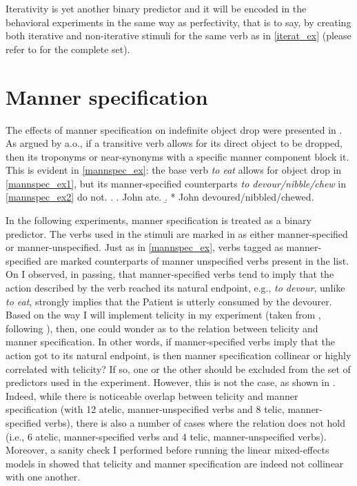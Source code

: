 Iterativity is yet another binary predictor and it will be encoded in the behavioral experiments in the same way as perfectivity, that is to say, by creating both iterative and non-iterative stimuli for the same verb as in \ref{iterat_ex} (please refer to  for the complete set).


\section{Manner specification} 

The effects of manner specification on indefinite object drop were presented in . As argued by \textcite{Ruda2017} a.o., if a transitive verb allows for its direct object to be dropped, then its troponyms or near-synonyms with a specific manner component block it. This is evident in \ref{mannspec_ex}: the base verb \textit{to eat} allows for object drop in \ref{mannspec_ex1}, but its manner-specified counterparts \textit{to devour/nibble/chew} in \ref{mannspec_ex2} do not.
\ex.\label{mannspec_ex} \a. John ate. \label{mannspec_ex1} 
\b. * John devoured/nibbled/chewed. \label{mannspec_ex2}

In the following experiments, manner specification is treated as a binary predictor. The verbs used in the stimuli are marked in  as either manner-specified or manner-unspecified. Just as in \ref{mannspec_ex}, verbs tagged as manner-specified are marked counterparts of manner unspecified verbs present in the list.\\
On  I observed, in passing, that manner-specified verbs tend to imply that the action described by the verb reached its natural endpoint, e.g., \textit{to devour}, unlike \textit{to eat}, strongly implies that the Patient is utterly consumed by the devourer. Based on the way I will implement telicity in my experiment (taken from \textcite{Olsen1997}, following \textcite{Medina2007}), then, one could wonder as to the relation between telicity and manner specification. In other words, if manner-specified verbs imply that the action got to its natural endpoint, is then manner specification collinear or highly correlated with telicity? If so, one or the other should be excluded from the set of predictors used in the experiment. However, this is not the case, as shown in . Indeed, while there is noticeable overlap between telicity and manner specification (with 12 atelic, manner-unspecified verbs and 8 telic, manner-specified verbs), there is also a number of cases where the relation does not hold (i.e., 6 atelic, manner-specified verbs and 4 telic, manner-unspecified verbs). Moreover, a sanity check I performed before running the linear mixed-effects models in  showed that telicity and manner specification are indeed not collinear with one another.